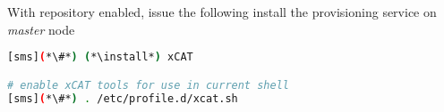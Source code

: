 With \xCAT{} repository enabled, issue the following install the provisioning
service on {\em master} node

\begin{lstlisting}[language=bash,keywords={}]
[sms](*\#*) (*\install*) xCAT

# enable xCAT tools for use in current shell
[sms](*\#*) . /etc/profile.d/xcat.sh
\end{lstlisting}


